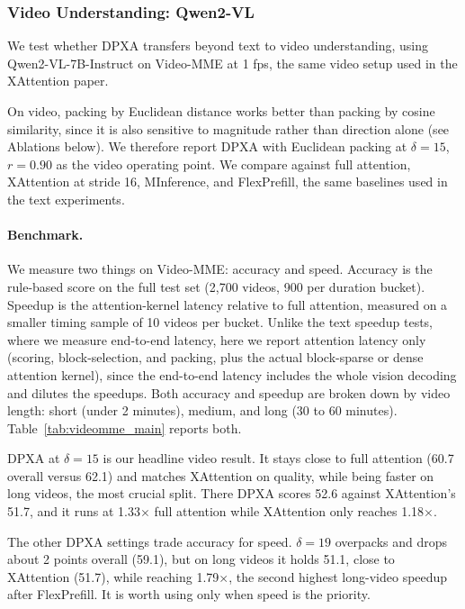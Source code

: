 \subsubsection{Video Understanding: Qwen2-VL}
\label{sec:results_video}

We test whether DPXA transfers beyond text to video understanding, using Qwen2-VL-7B-Instruct on Video-MME at 1 fps, the same video setup used in the XAttention paper. 

On video, packing by Euclidean distance works better than packing by cosine similarity, since it is also sensitive to magnitude rather than direction alone (see Ablations below). We therefore report DPXA with Euclidean packing at $\delta{=}15$, $r{=}0.90$ as the video operating point. We compare against full attention, XAttention at stride 16, MInference, and FlexPrefill, the same baselines used in the text experiments.

\paragraph{Benchmark.}

We measure two things on Video-MME: accuracy and speed. Accuracy is the rule-based score on the full test set (2,700 videos, 900 per duration bucket). Speedup is the attention-kernel latency relative to full attention, measured on a smaller timing sample of 10 videos per bucket. Unlike the text speedup tests, where we measure end-to-end latency, here we report attention latency only (scoring, block-selection, and packing, plus the actual block-sparse or dense attention kernel), since the end-to-end latency includes the whole vision decoding and dilutes the speedups. Both accuracy and speedup are broken down by video length: short (under 2 minutes), medium, and long (30 to 60 minutes). Table~\ref{tab:videomme_main} reports both.

DPXA at $\delta{=}15$ is our headline video result. It stays close to full attention (60.7 overall versus 62.1) and matches XAttention on quality, while being faster on long videos, the most crucial split. There DPXA scores 52.6 against XAttention's 51.7, and it runs at 1.33$\times$ full attention while XAttention only reaches 1.18$\times$.

The other DPXA settings trade accuracy for speed. $\delta{=}19$ overpacks and drops about 2 points overall (59.1), but on long videos it holds 51.1, close to XAttention (51.7), while reaching 1.79$\times$, the second highest long-video speedup after FlexPrefill. It is worth using only when speed is the priority.


